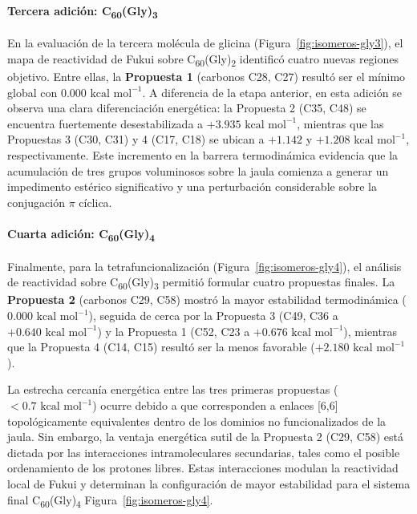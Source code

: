 \paragraph{Tercera adición: C\textsubscript{60}(Gly)\textsubscript{3}}
En la evaluación de la tercera molécula de glicina (Figura~\ref{fig:isomeros-gly3}), el mapa de reactividad de Fukui sobre C\textsubscript{60}(Gly)\textsubscript{2} identificó cuatro nuevas regiones objetivo. Entre ellas, la \textbf{Propuesta 1} (carbonos C28, C27) resultó ser el mínimo global con $0.000\text{ kcal mol}^{-1}$. A diferencia de la etapa anterior, en esta adición se observa una clara diferenciación energética: la Propuesta 2 (C35, C48) se encuentra fuertemente desestabilizada a $+3.935\text{ kcal mol}^{-1}$, mientras que las Propuestas 3 (C30, C31) y 4 (C17, C18) se ubican a $+1.142$ y $+1.208\text{ kcal mol}^{-1}$, respectivamente. Este incremento en la barrera termodinámica evidencia que la acumulación de tres grupos voluminosos sobre la jaula comienza a generar un impedimento estérico significativo y una perturbación considerable sobre la conjugación $\pi$ cíclica.

\paragraph{Cuarta adición: C\textsubscript{60}(Gly)\textsubscript{4}}
Finalmente, para la tetrafuncionalización (Figura~\ref{fig:isomeros-gly4}), el análisis de reactividad sobre C\textsubscript{60}(Gly)\textsubscript{3} permitió formular cuatro propuestas finales. La \textbf{Propuesta 2} (carbonos C29, C58) mostró la mayor estabilidad termodinámica ($0.000\text{ kcal mol}^{-1}$), seguida de cerca por la Propuesta 3 (C49, C36 a $+0.640\text{ kcal mol}^{-1}$) y la Propuesta 1 (C52, C23 a $+0.676\text{ kcal mol}^{-1}$), mientras que la Propuesta 4 (C14, C15) resultó ser la menos favorable ($+2.180\text{ kcal mol}^{-1}$). 

La estrecha cercanía energética entre las tres primeras propuestas ($< 0.7\text{ kcal mol}^{-1}$) ocurre debido a que corresponden a enlaces [6,6] topológicamente equivalentes dentro de los dominios no funcionalizados de la jaula. Sin embargo, la ventaja energética sutil de la Propuesta 2 (C29, C58) está dictada por las interacciones intramoleculares secundarias, tales como el posible ordenamiento de los protones libres. Estas interacciones modulan la reactividad local de Fukui y determinan la configuración de mayor estabilidad para el sistema final C\textsubscript{60}(Gly)\textsubscript{4} Figura~\ref{fig:isomeros-gly4}.  
